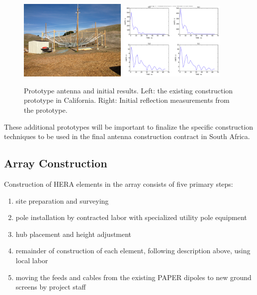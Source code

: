 \documentclass[preprint]{aastex}
\begin{document}
\begin{figure}[h]
	\centering
		\includegraphics[width=0.46\textwidth]{plots/heracles.png}
		\includegraphics[width=0.46\textwidth]{plots/Engineering/heraclesNA.png}
	\caption{Prototype antenna and initial results.
		Left: the existing construction prototype in California.
        Right: Initial reflection measurements from the prototype.}
	\label{fig:heracles}
\end{figure}

These additional prototypes will be important to finalize the specific construction techniques to be 
used in the final antenna construction contract in South Africa.

\vspace{-0.25in}
\subsection{Array Construction}
\vspace{-6pt}
Construction of HERA elements in the array consists of five primary steps: 
\begin{enumerate}
\item site preparation and surveying 
\item pole installation by contracted labor with specialized utility pole equipment 
\item hub placement and height adjustment
\item remainder of construction of each element, following description above, using local labor 
\item moving the feeds and cables from the existing PAPER dipoles to new ground screens by project staff
\end{enumerate}
\end{document}

